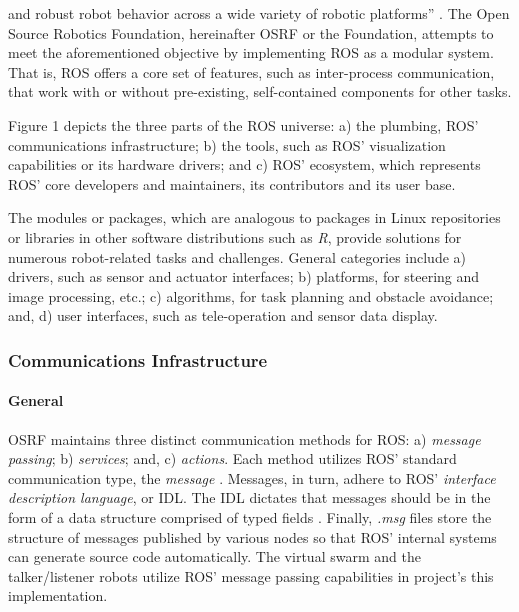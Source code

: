 \documentclass[9pt,twocolumn,twoside]{../../styles/osajnl}
\begin{document}
and robust robot behavior across a wide variety of robotic platforms'' \cite{www-ros-about}. The Open Source Robotics Foundation, hereinafter OSRF or the Foundation, attempts to meet the aforementioned objective by implementing ROS as a modular system.  That is, ROS offers a core set of features, such as inter-process communication, that work with or without pre-existing, self-contained components for other tasks.

Figure 1 depicts the three parts of the ROS universe: a) the plumbing, ROS' communications infrastructure; b) the tools, such as ROS' visualization capabilities or its hardware drivers; and c) ROS' ecosystem, which represents ROS' core developers and maintainers, its contributors and its user base.

The modules or packages, which are analogous to packages in Linux repositories or libraries in other software distributions such as \textit{R}, provide solutions for numerous robot-related tasks and challenges.  General categories include a) drivers, such as sensor and actuator interfaces; b) platforms, for steering and image processing, etc.; c) algorithms, for task planning and obstacle avoidance; and, d) user interfaces, such as tele-operation and sensor data display. \cite{www-software-categories}

\subsubsection{Communications Infrastructure}
\paragraph{General}
OSRF maintains three distinct communication methods for ROS: a) \textit{message passing}; b) \textit{services}; and, c) \textit{actions}.  Each method utilizes ROS' standard communication type, the \textit{message} \cite{www-ros-core-components}.  Messages, in turn, adhere to ROS' \textit{interface description language}, or IDL. The IDL dictates that messages should be in the form of a data structure comprised of typed fields \cite{www-ros-messages}. Finally, \textit{.msg} files store the structure of messages published by various nodes so that ROS' internal systems can generate source code automatically.  The virtual swarm and the talker/listener robots utilize ROS' message passing capabilities in project's this implementation.
\end{document}
